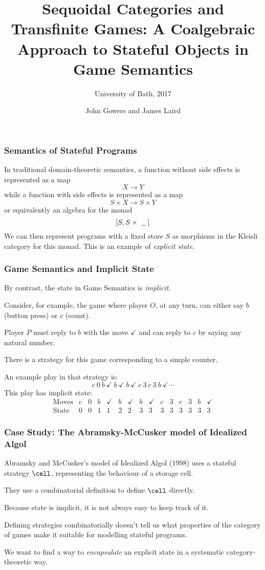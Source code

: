 \documentclass{beamer}
\title{Sequoidal Categories and Transfinite Games: A Coalgebraic Approach to Stateful Objects in Game Semantics}
\subtitle{University of Bath, 2017}
\author{John Gowers and James Laird}
\newcommand{\tick}{\checkmark}
\begin{document}
\begin{frame}
  \titlepage
\end{frame}

\begin{frame}
  \frametitle{Semantics of Stateful Programs}
  In traditional domain-theoretic semantics, a function without side effects is represented as a map
  \[
    X \to Y
    \]
  \pause
  while a function with side effects is represented as a map
  \[
    S \times X \to S \times Y
    \]
  \pause
  or equivalently an algebra for the monad
  \[
    [S, S \times \;\underline{\hspace{1.5ex}}\;]
    \]
  \pause
  We can then represent programs with a fixed store $S$ as morphisms in the Kleisli category for this monad.
  \pause
  This is an example of \emph{explicit state}.
\end{frame}

\begin{frame}
  \frametitle{Game Semantics and Implicit State}
  By contrast, the state in Game Semantics is \emph{implicit}.
  \pause

  Consider, for example, the game where player $O$, at any turn, can either say $b$ (button press) or $c$ (count).  
  
  Player $P$ must reply to $b$ with the move $\tick$ and can reply to $c$ by saying any natural number.
  \pause

  There is a strategy for this game corresponding to a simple counter.
  \pause

  An example play in that strategy is:
  \[
    c\ 0\ b\ \tick\ b\ \tick\ b\ \tick\ c\ 3\ c\ 3\ b\ \tick\cdots
    \]
  \pause
  This play has implicit state:
  \[
    \begin{array}{r|cccccccccccccc}
      \text{Moves} & c & 0 & b & \tick & b & \tick & b & \tick & c & 3 & c & 3 & b & \tick \\
      \text{State} & 0 & 0 & 1 & 1 & 2 & 2 & 3 & 3 & 3 & 3 & 3 & 3 & 3 & 3
    \end{array}
    \]
\end{frame}

\begin{frame}
  \frametitle{Case Study: The Abramsky-McCusker model of Idealized Algol}
  Abramsky and McCusker's model of Idealized Algol (1998) uses a stateful strategy $\cell$, representing the behaviour of a storage cell.
  \pause

  They use a combinatorial definition to define $\cell$ directly.  
  \pause

  Because state is implicit, it is not always easy to keep track of it.
  \pause

  Defining strategies combinatorially doesn't tell us what properties of the category of games make it suitable for modelling stateful programs.  
  \pause

  We want to find a way to \emph{encapsulate} an explicit state in a systematic category-theoretic way.
\end{frame}
\end{document}
